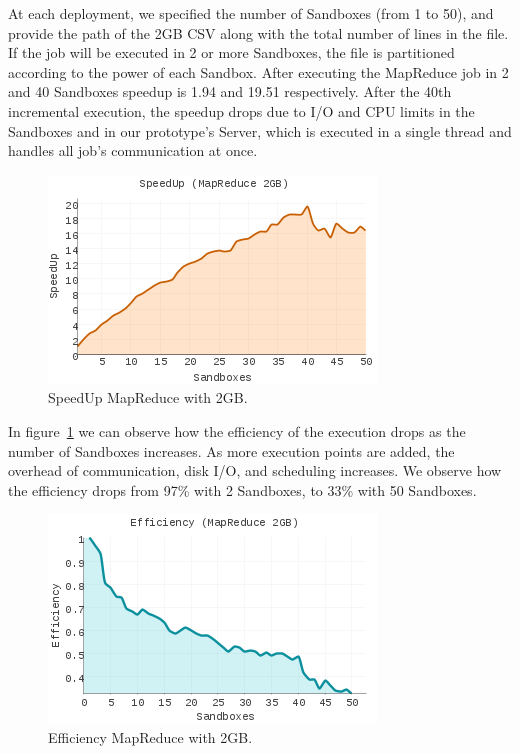 \documentclass[10pt,reprint]{socc14}
\begin{document}
At each deployment, we specified the number of Sandboxes (from 1 to 50), and provide the path of the 2GB CSV along with the total number of lines in the file. If the job will be executed in 2 or more Sandboxes, the file is partitioned according to the power of each Sandbox. After executing the MapReduce job in 2 and 40 Sandboxes speedup is 1.94 and 19.51 respectively. After the 40th incremental execution, the speedup drops due to I/O and CPU limits in the Sandboxes and in our prototype’s Server, which is executed in a single thread and handles all job’s communication at once.


\begin{figure}	
	\centering
	\includegraphics[scale=2.5]{SpeedUp_MapReduce_2GB_Small}
	\caption{SpeedUp MapReduce with 2GB.}
	\label{fig:SpeedUp_MapReduce}
\end{figure}


In figure~\ref{fig:SpeedUp_MapReduce} we can observe how the efficiency of the execution drops as the number of Sandboxes increases. As more execution points are added, the overhead of communication, disk I/O, and scheduling increases. We observe how the efficiency drops from 97\% with 2 Sandboxes, to 33\% with 50 Sandboxes.


\begin{figure}	
	\centering
	\includegraphics[scale=2.5]{Efficiency_MapReduce_2GB_small}
	\caption{Efficiency MapReduce with 2GB.}
	\label{fig:Efficiency}
\end{figure}
\end{document}
